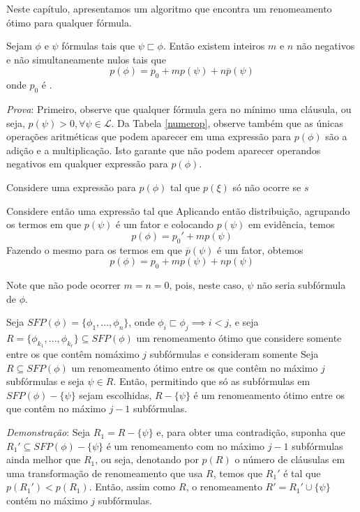 
\indent

Neste capítulo, apresentamos um algoritmo que encontra um renomeamento ótimo para qualquer fórmula.

\begin{lemma}
	Sejam $\phi$ e $\psi$ fórmulas tais que $\psi \sqsubset \phi$. Então existem inteiros $m$ e $n$ não negativos e não simultaneamente nulos tais que $$p(\phi) = p_0 + m p(\psi) + n \overline{p}(\psi)$$ onde $p_0$ é .
\end{lemma}

\emph{Prova}: Primeiro, observe que qualquer fórmula gera no mínimo uma cláusula, ou seja, $p(\psi) > 0, \forall \psi \in \mathcal{L}$. Da Tabela \ref{numerop}, observe também que as únicas operações aritméticas que podem aparecer em uma expressão para $p(\phi)$ são a adição e a multiplicação. Isto garante que não podem aparecer operandos negativos em qualquer expressão para $p(\phi)$.

Considere uma expressão para $p(\phi)$ tal que $p(\xi)$ só não ocorre se $s$

Considere então uma expressão tal que Aplicando então distribuição, agrupando os termos em que $p(\psi)$ é um fator e colocando $p(\psi)$ em evidência, temos $$p(\phi) = p_0' + m p(\psi)$$ Fazendo o mesmo para os termos em que $\overline{p}(\psi)$ é um fator, obtemos $$p(\phi) = p_0 + m p(\psi) + n p(\psi)$$

Note que não pode ocorrer $m = n = 0$, pois, neste caso, $\psi$ não seria subfórmula de $\phi$.

\begin{theorem}
	\label{optimal_sub}
	Seja $SFP(\phi) = \{\phi_1,...,\phi_n \}$, onde $\phi_i \sqsubset \phi_j \implies i < j$, e seja\break $R = \{\phi_{k_1},...,\phi_{k_r} \} \subseteq SFP(\phi)$ um renomeamento ótimo que considere somente entre os que contêm no\break máximo $j$ subfórmulas e consideram somente
	Seja $R \subseteq SFP(\phi)$ um renomeamento ótimo entre os que contêm no máximo $j$ subfórmulas e seja $\psi \in R$. Então, permitindo que só as subfórmulas em $SFP(\phi) - \{\psi \}$ sejam escolhidas, $R - \{\psi\}$ é um renomeamento ótimo entre os que contêm no máximo $j-1$ subfórmulas.
\end{theorem}

\emph{Demonstração}: Seja $R_1 = R - \{\psi\}$ e, para obter uma contradição, suponha que $R_1' \subseteq SFP(\phi) - \{\psi \}$ é um renomeamento com no máximo $j-1$ subfórmulas ainda melhor que $R_1$, ou seja, denotando por $p(R)$ o número de cláusulas em uma transformação de renomeamento que usa $R$, temos que $R_1'$ é tal que $p(R_1') < p(R_1)$. Então, assim como $R$, o renomeamento $R' = R_1' \cup \{\psi \}$ contém no máximo $j$ subfórmulas.


